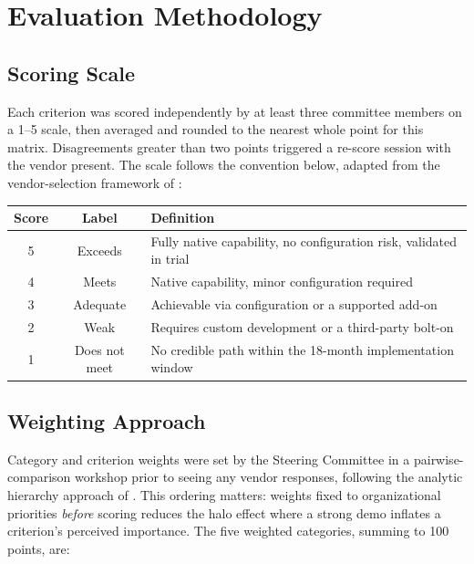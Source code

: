 \section{Evaluation Methodology}

\subsection{Scoring Scale}

Each criterion was scored independently by at least three committee members on a 1--5 scale,
then averaged and rounded to the nearest whole point for this matrix. Disagreements greater
than two points triggered a re-score session with the vendor present. The scale follows the
convention below, adapted from the vendor-selection framework of \citet{dickson1966}:

\begin{center}
\begin{tabularx}{0.92\linewidth}{c c X}
\toprule
\textbf{Score} & \textbf{Label} & \textbf{Definition} \\
\midrule
5 & Exceeds & Fully native capability, no configuration risk, validated in trial \\
4 & Meets & Native capability, minor configuration required \\
3 & Adequate & Achievable via configuration or a supported add-on \\
2 & Weak & Requires custom development or a third-party bolt-on \\
1 & Does not meet & No credible path within the 18-month implementation window \\
\bottomrule
\end{tabularx}
\end{center}

\subsection{Weighting Approach}

Category and criterion weights were set by the Steering Committee in a pairwise-comparison
workshop prior to seeing any vendor responses, following the analytic hierarchy approach of
\citet{saaty1980}. This ordering matters: weights fixed to organizational priorities \emph{before}
scoring reduces the halo effect where a strong demo inflates a criterion's perceived
importance. The five weighted categories, summing to 100 points, are:

